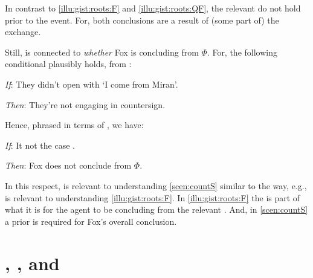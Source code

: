 \begin{note}
  In contrast to  \ref{illu:gist:roots:F} and \ref{illu:gist:roots:QF}, the relevant \fofr{} do not hold prior to the event.
  For, both conclusions are a result of (some part of) the exchange.

  Still,  is connected to \emph{whether} Fox is concluding  from \(\Phi\).
  For, the following conditional plausibly holds, from :

  \begin{itenum}
  \item[\emph{If}:]
    They didn't open with `I come from Miran'.
  \item[\emph{Then}:]
    They're not engaging in countersign.
  \end{itenum}

  \noindent%
  Hence, phrased in terms of , we have:
  \begin{itenum}
  \item[\emph{If}:]
    It not the case .
  \item[\emph{Then}:]
    Fox does not conclude  from \(\Phi\).
  \end{itenum}
  In this respect,  is relevant to understanding \autoref{scen:countS} similar to the way, e.g.,  is relevant to understanding \autoref{illu:gist:roots:F}.
  In \autoref{illu:gist:roots:F} the \fingfr{} is part of what it is for the agent to be concluding  from the relevant \pool{}.
  And, in \autoref{scen:countS} a prior  is required for Fox's overall conclusion.
\end{note}



\section{\qWhy{}, \qHow{}, and \issueInclusion{}}
\label{cha:intro:why-how}


